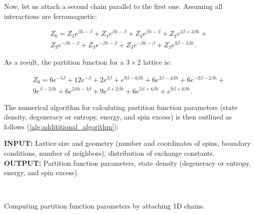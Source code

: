 \documentclass[utf8, babel, sor, jor, amsmath, amssymb, reprint]{elsarticle} %
\begin{document}
Now, let us attach a second chain parallel to the first one. Assuming all interactions are ferromagnetic:

\begin{equation}
	\label{eq:stat_3_un}
	\begin{alignedat}{2}
		Z_6 = Z_3 e^{\beta h-\beta} + Z_3 e^{\beta h-\beta} + Z_3 e^{\beta h-\beta} + Z_3 e^{3 \beta +3 \beta h} + \\
		Z_3 e^{-\beta h-\beta} + Z_3 e^{-\beta h-\beta} + Z_3 e^{-\beta h-\beta} + Z_3 e^{3 \beta -3 \beta h}.
	\end{alignedat}
\end{equation}

As a result, the partition function for a $3 \times 2$ lattice is:

\begin{equation}
	\label{eq:stat_3_res}
	\begin{alignedat}{2}
		Z_6 = 6 e^{-5 \beta } + 12 e^{-\beta } + 2 e^{3 \beta } + e^{9 \beta -6 \beta  h} + 6 e^{3 \beta -4 \beta  h} + 6 e^{-3 \beta -2 \beta  h} + \\
		9 e^{\beta -2 \beta  h} + 6 e^{2 \beta  h-3 \beta } + 9 e^{\beta +2 \beta  h} + 6 e^{3 \beta +4 \beta  h} + e^{9 \beta +6 \beta  h}.
	\end{alignedat}
\end{equation}

The numerical algorithm for calculating partition function parameters (state density, degeneracy or entropy, energy, and spin excess) is then outlined as follows (\ref{alg:addititional_algorithm}):

\begin{algorithm}[H]
	\textbf{INPUT:} Lattice size and geometry (number and coordinates of spins, boundary conditions, number of neighbors), distribution of exchange constants.\\
	\textbf{OUTPUT:} Partition function parameters, state density (degeneracy or entropy, energy, and spin excess).
	\begin{algorithmic}
		{
			{
			}
			\ENDFOR \\
		}
		\ENDFOR
	\end{algorithmic}
	\caption{Computing partition function parameters by attaching 1D chains.}
	\label{alg:addititional_algorithm}
\end{algorithm}
\end{document}
